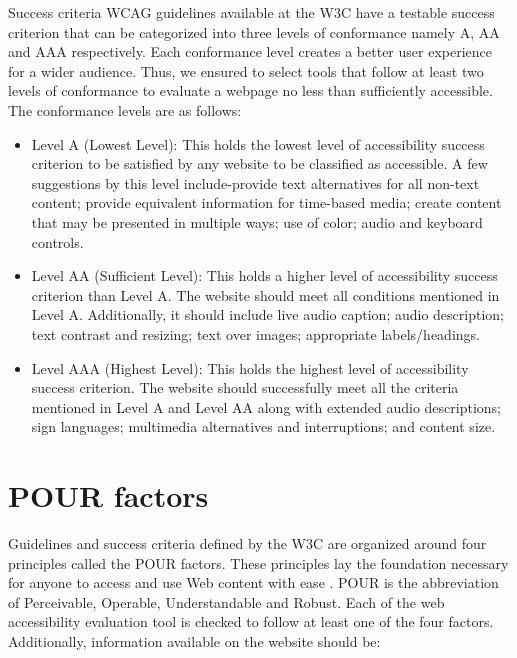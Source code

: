 \documentclass{IEEEtran}
\begin{document}
Success criteria WCAG guidelines available at the W3C have a testable success criterion \cite{W3C2008} that can be categorized into three levels of conformance namely A, AA and AAA respectively. Each conformance level creates a better user experience for a wider audience. Thus, we ensured to select tools that follow at least two levels of conformance to evaluate a webpage no less than sufficiently accessible. The conformance levels are as follows:
\begin{itemize}
    \item Level A (Lowest Level): This holds the lowest level of accessibility success criterion to be satisfied by any website to be classified as accessible. A few suggestions by this level include-provide text alternatives for all non-text content; provide equivalent information for time-based media; create content that may be presented in multiple ways; use of color; audio and keyboard controls. 
    \item Level AA (Sufficient Level): This holds a higher level of accessibility success criterion than Level A. The website should meet all conditions mentioned in Level A. Additionally, it should include live audio caption; audio description; text contrast and resizing; text over images; appropriate labels/headings.
    \item Level AAA (Highest Level): This holds the highest level of accessibility success criterion. The website should successfully meet all the criteria mentioned in Level A and Level AA along with extended audio descriptions; sign languages; multimedia alternatives and interruptions; and content size.
\end{itemize} 

\section{POUR factors}

Guidelines and success criteria defined by the W3C are organized around four principles called the POUR factors. These principles lay the foundation necessary for anyone to access and use Web content with ease \cite{Moorman1999}. POUR is the abbreviation of Perceivable, Operable, Understandable and Robust. Each of the web accessibility evaluation tool is checked to follow at least one of the four factors. Additionally, information available on the website should be:
\end{document}
